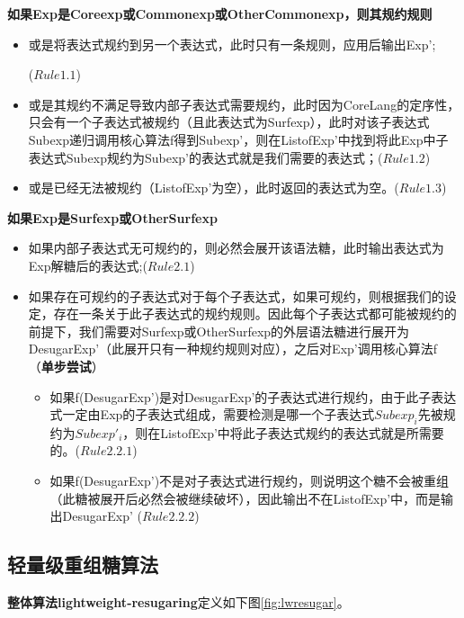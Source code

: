 \begin{flushleft}
	\large{\bfseries{
			如果Exp是Coreexp或Commonexp或OtherCommonexp，则其规约规则	
		}	
	}	
\end{flushleft}
\begin{itemize}
	\item 或是将表达式规约到另一个表达式，此时只有一条规则，应用后输出Exp';
	
	($Rule1.1$)
	\item 或是其规约不满足导致内部子表达式需要规约，此时因为CoreLang的定序性，只会有一个子表达式被规约（且此表达式为Surfexp），此时对该子表达式Subexp递归调用核心算法f得到Subexp’，则在ListofExp'中找到将此Exp中子表达式Subexp规约为Subexp’的表达式就是我们需要的表达式；($Rule1.2$)
	\item 或是已经无法被规约（ListofExp'为空），此时返回的表达式为空。($Rule1.3$)
\end{itemize}

\begin{flushleft}
	\large{\bfseries{
			如果Exp是Surfexp或OtherSurfexp	
		}
	}
\end{flushleft}
\begin{itemize}
	\item 如果内部子表达式无可规约的，则必然会展开该语法糖，此时输出表达式为Exp解糖后的表达式;($Rule2.1$)
	\item 如果存在可规约的子表达式对于每个子表达式，如果可规约，则根据我们的设定，存在一条关于此子表达式的规约规则。因此每个子表达式都可能被规约的前提下，我们需要对Surfexp或OtherSurfexp的外层语法糖进行展开为DesugarExp’（此展开只有一种规约规则对应），之后对Exp’调用核心算法f（{\bfseries 单步尝试}）
	\begin{itemize}
		\item 如果f(DesugarExp')是对DesugarExp'的子表达式进行规约，由于此子表达式一定由Exp的子表达式组成，需要检测是哪一个子表达式$Subexp_{i}$先被规约为$Subexp'_{i}$，则在ListofExp'中将此子表达式规约的表达式就是所需要的。($Rule2.2.1$)
		\item 如果f(DesugarExp')不是对子表达式进行规约，则说明这个糖不会被重组（此糖被展开后必然会被继续破坏），因此输出不在ListofExp'中，而是输出DesugarExp'
			($Rule2.2.2$)
	\end{itemize}
\end{itemize}

\subsection{轻量级重组糖算法}

{\bfseries 整体算法lightweight-resugaring}定义如下图\ref{fig:lwresugar}。

